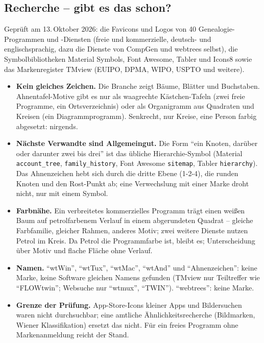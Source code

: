 \documentclass[a4paper, 11pt, parskip=half, headings=small, numbers=noenddot]{scrartcl}
\begin{document}
\subsection{Recherche – gibt es das schon?}

Geprüft am 13.\,Oktober 2026: die Favicons und Logos von 40 Genealogie-Programmen und -Diensten (freie und kommerzielle, deutsch- und
englischsprachig, dazu die Dienste von CompGen und webtrees selbst), die Symbolbibliotheken Material Symbols, Font Awesome, Tabler und Icons8 sowie
das Markenregister TMview (EUIPO, DPMA, WIPO, USPTO und weitere).

\begin{itemize}
\item \textbf{Kein gleiches Zeichen.} Die Branche zeigt Bäume, Blätter und Buchstaben. Ahnentafel-Motive gibt es nur als waagrechte Kästchen-Tafeln
  (zwei freie Programme, ein Ortsverzeichnis) oder als Organigramm aus Quadraten und Kreisen (ein Diagrammprogramm). Senkrecht, nur Kreise, eine
  Person farbig abgesetzt: nirgends.
\item \textbf{Nächste Verwandte sind Allgemeingut.} Die Form \enquote{ein Knoten, darüber oder darunter zwei bis drei} ist das übliche Hierarchie-Symbol
  (Material \texttt{account\_tree}, \texttt{family\_history}, Font Awesome \texttt{sitemap}, Tabler \texttt{hierarchy}). Das Ahnenzeichen hebt sich durch
  die dritte Ebene (1-2-4), die runden Knoten und den Rost-Punkt ab; eine Verwechslung mit einer Marke droht nicht, nur mit einem Symbol.
\item \textbf{Farbnähe.} Ein verbreitetes kommerzielles Programm trägt einen weißen Baum auf petrolfarbenem Verlauf in einem abgerundeten Quadrat –
  gleiche Farbfamilie, gleicher Rahmen, anderes Motiv; zwei weitere Dienste nutzen Petrol im Kreis. Da Petrol die Programmfarbe ist, bleibt es;
  Unterscheidung über Motiv und flache Fläche ohne Verlauf.
\item \textbf{Namen.} \enquote{wtWin}, \enquote{wtTux}, \enquote{wtMac}, \enquote{wtAnd} und \enquote{Ahnenzeichen}: keine Marke, keine Software
  gleichen Namens gefunden (TMview nur Teiltreffer wie \enquote{FLOWtwin}; Websuche nur \enquote{wtmux}, \enquote{TWIN}). \enquote{webtrees}: keine Marke.
\item \textbf{Grenze der Prüfung.} App-Store-Icons kleiner Apps und Bildersuchen waren nicht durchsuchbar; eine amtliche Ähnlichkeitsrecherche
  (Bildmarken, Wiener Klassifikation) ersetzt das nicht. Für ein freies Programm ohne Markenanmeldung reicht der Stand.
\end{itemize}
\end{document}
